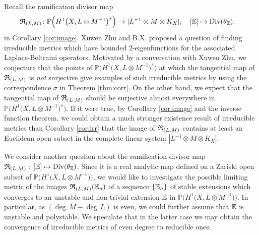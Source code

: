 \documentclass[12pt]{article}
\begin{document}
Recall the ramification divisor map
\begin{align*}
{\frak R}_{(L, M)}\colon \mathbb{P}\Big(H^{1}\big(X, L \otimes M^{-1}\big)^{s}\Big) &\rightarrow |L^{-1} \otimes M \otimes K_{X}|, \quad
[{\Bbb E}]\mapsto {\rm Div}(\theta_{\Bbb E}).
\end{align*}
in Corollary \ref{cor:image}.
Xuwen Zhu and B.X. \cite[Section 5]{XuZhu19} proposed a question of finding irreducible metrics which have bounded 2-eigenfunctions for the associated Laplace-Beltrami operators. Motivated by a conversation with Xuwen Zhu, we conjecture that
the points of $\mathbb{P}\Big(H^{1}\big(X, L \otimes M^{-1}\big)^{s}\Big)$  at which the tangential map of ${\frak R}_{(L, M)}$  is {\it not} surjective give examples of such irreducible metrics by using the correspondence $\sigma$ in Theorem \ref{thm:corr}. On the other hand, we expect that the tangential map of ${\frak R}_{(L, M)}$ should be surjective almost everywhere in $\mathbb{P}\Big(H^{1}\big(X, L \otimes M^{-1}\big)^{s}\Big)$. If it were true, by Corollary \ref{cor:image} and the inverse function theorem,  we could obtain a much stronger existence result of irreducible metrics than Corollary \ref{cor:irr} that  the image of ${\frak R}_{(L, M)}$ contains at least an Euclidean open subset in the complete linear system $|L^{-1} \otimes M \otimes K_{X}|$.

We consider another question about the ramification divisor map ${\frak R}_{(L, M)}:\,[{\Bbb E}]\mapsto {\rm Div}(\theta_{\Bbb E})$. Since it is a real analytic map defined on a Zariski open subset of $\mathbb{P}\Big(H^{1}\big(X, L \otimes M^{-1}\big)\Big)$, we would like to investigate the possible limiting metric of the images ${\frak R}_{(L, M)}({\Bbb E}_n)$ of a sequence $\{{\Bbb E_n}\}$ of stable extensions  which converges to an  unstable and non-trivial extension ${\Bbb E}$ in $\mathbb{P}\Big(H^{1}\big(X, L \otimes M^{-1}\big)\Big)$. In particular, as $(\deg\,M - \deg\,L)$ is even, we could further assume that ${\Bbb E}$ is unstable and polystable. We speculate that in the latter case we may obtain the convergence of irreducible metrics of even degree to reducible ones.
\end{document}
